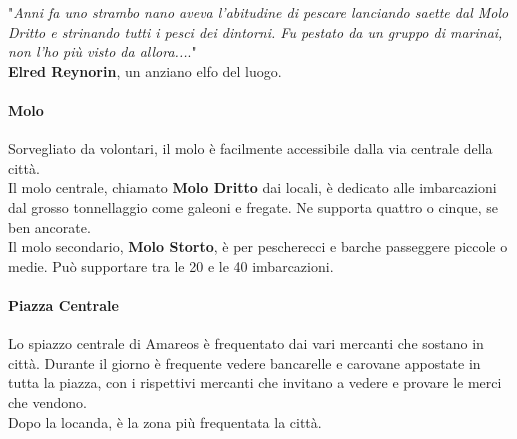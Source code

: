 \documentclass[10pt,twoside,onecolumn,openany]{book}
\begin{document}
\begin{multicols}{2}
\begin{quotebox}
"\textit{Anni fa uno strambo nano aveva l'abitudine di pescare lanciando saette dal Molo Dritto e strinando tutti i pesci dei dintorni. Fu pestato da un gruppo di marinai, non l'ho più visto da allora...}."\\ \textbf{Elred Reynorin}, un anziano elfo del luogo.
\end{quotebox}
\columnbreak
\paragraph{Molo}
Sorvegliato da volontari, il molo è facilmente accessibile dalla via centrale della città.\\
Il molo centrale, chiamato \textbf{Molo Dritto} dai locali, è dedicato alle imbarcazioni dal grosso tonnellaggio come galeoni e fregate. Ne supporta quattro o cinque, se ben ancorate.\\
Il molo secondario, \textbf{Molo Storto}, è per pescherecci e barche passeggere piccole o medie. Può supportare tra le 20 e le 40 imbarcazioni.\\
\end{multicols}
\paragraph{Piazza Centrale}
Lo spiazzo centrale di Amareos è frequentato dai vari mercanti che sostano in città. Durante il giorno è frequente vedere bancarelle e carovane appostate in tutta la piazza, con i rispettivi mercanti che invitano a vedere e provare le merci che vendono.\\
Dopo la locanda, è la zona più frequentata la città.\\
\end{document}
